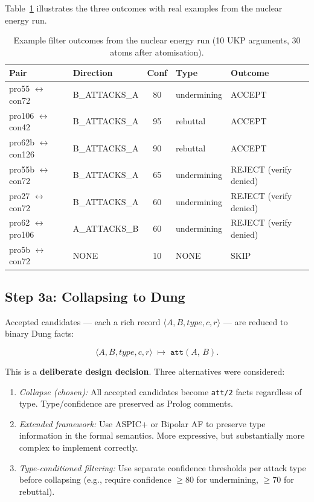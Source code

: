 \documentclass[runningheads]{llncs}
\begin{document}
Table~\ref{tab:filter} illustrates the three outcomes with real examples
from the nuclear energy run.

\begin{table}[t]
\caption{Example filter outcomes from the nuclear energy run (10 UKP
  arguments, 30 atoms after atomisation).}
\label{tab:filter}
\centering\small
\begin{tabular}{llcll}
\toprule
Pair & Direction & Conf & Type & Outcome \\
\midrule
pro55 $\leftrightarrow$ con72  & B\_ATTACKS\_A & 80 & undermining & ACCEPT \\
pro106 $\leftrightarrow$ con42 & B\_ATTACKS\_A & 95 & rebuttal    & ACCEPT \\
pro62b $\leftrightarrow$ con126 & B\_ATTACKS\_A & 90 & rebuttal   & ACCEPT \\
pro55b $\leftrightarrow$ con72  & B\_ATTACKS\_A & 65 & undermining & REJECT (verify denied) \\
pro27 $\leftrightarrow$ con72   & B\_ATTACKS\_A & 60 & undermining & REJECT (verify denied) \\
pro62 $\leftrightarrow$ pro106  & A\_ATTACKS\_B & 60 & undermining & REJECT (verify denied) \\
pro5b $\leftrightarrow$ con72   & NONE          & 10 & NONE        & SKIP \\
\bottomrule
\end{tabular}
\end{table}

\subsection{Step 3a: Collapsing to Dung}
\label{sec:collapsing}

Accepted candidates — each a rich record $\langle A, B,
\textit{type}, c, r \rangle$ — are reduced to binary Dung facts:

\begin{equation}
  \langle A, B, \textit{type}, c, r \rangle \;\longmapsto\; \texttt{att}(A,\, B).
\end{equation}

This is a \textbf{deliberate design decision}. Three alternatives were
considered:

\begin{enumerate}
  \item \emph{Collapse (chosen):} All accepted candidates become
    \texttt{att/2} facts regardless of type. Type/confidence are
    preserved as Prolog comments.
  \item \emph{Extended framework:} Use ASPIC+ or Bipolar AF to
    preserve type information in the formal semantics. More expressive,
    but substantially more complex to implement correctly.
  \item \emph{Type-conditioned filtering:} Use separate confidence
    thresholds per attack type before collapsing (e.g., require
    confidence $\geq 80$ for undermining, $\geq 70$ for rebuttal).
\end{enumerate}
\end{document}
